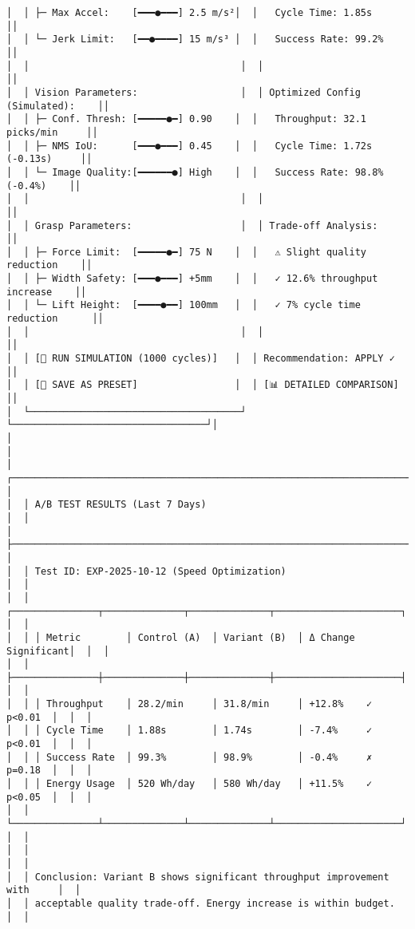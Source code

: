 \documentclass[
]{article}
\begin{document}
\begin{verbatim}
│  │ ├─ Max Accel:    [━━━●━━━] 2.5 m/s²│  │   Cycle Time: 1.85s              ││
│  │ └─ Jerk Limit:   [━━●━━━━] 15 m/s³ │  │   Success Rate: 99.2%            ││
│  │                                     │  │                                  ││
│  │ Vision Parameters:                  │  │ Optimized Config (Simulated):    ││
│  │ ├─ Conf. Thresh: [━━━━━●━] 0.90    │  │   Throughput: 32.1 picks/min     ││
│  │ ├─ NMS IoU:      [━━━●━━━] 0.45    │  │   Cycle Time: 1.72s (-0.13s)     ││
│  │ └─ Image Quality:[━━━━━━●] High    │  │   Success Rate: 98.8% (-0.4%)    ││
│  │                                     │  │                                  ││
│  │ Grasp Parameters:                   │  │ Trade-off Analysis:              ││
│  │ ├─ Force Limit:  [━━━━━●━] 75 N    │  │   ⚠️ Slight quality reduction    ││
│  │ ├─ Width Safety: [━━━●━━━] +5mm    │  │   ✓ 12.6% throughput increase    ││
│  │ └─ Lift Height:  [━━━━●━━] 100mm   │  │   ✓ 7% cycle time reduction      ││
│  │                                     │  │                                  ││
│  │ [🔬 RUN SIMULATION (1000 cycles)]   │  │ Recommendation: APPLY ✓          ││
│  │ [💾 SAVE AS PRESET]                 │  │ [📊 DETAILED COMPARISON]         ││
│  └─────────────────────────────────────┘  └──────────────────────────────────┘│
│                                                                                │
│  ┌─────────────────────────────────────────────────────────────────────────┐  │
│  │ A/B TEST RESULTS (Last 7 Days)                                          │  │
│  ├─────────────────────────────────────────────────────────────────────────┤  │
│  │ Test ID: EXP-2025-10-12 (Speed Optimization)                            │  │
│  │ ┌───────────────┬──────────────┬──────────────┬──────────────────────┐  │  │
│  │ │ Metric        │ Control (A)  │ Variant (B)  │ Δ Change  Significant│  │  │
│  │ ├───────────────┼──────────────┼──────────────┼──────────────────────┤  │  │
│  │ │ Throughput    │ 28.2/min     │ 31.8/min     │ +12.8%    ✓ p<0.01  │  │  │
│  │ │ Cycle Time    │ 1.88s        │ 1.74s        │ -7.4%     ✓ p<0.01  │  │  │
│  │ │ Success Rate  │ 99.3%        │ 98.9%        │ -0.4%     ✗ p=0.18  │  │  │
│  │ │ Energy Usage  │ 520 Wh/day   │ 580 Wh/day   │ +11.5%    ✓ p<0.05  │  │  │
│  │ └───────────────┴──────────────┴──────────────┴──────────────────────┘  │  │
│  │                                                                         │  │
│  │ Conclusion: Variant B shows significant throughput improvement with     │  │
│  │ acceptable quality trade-off. Energy increase is within budget.         │  │

\end{verbatim}
\end{document}
